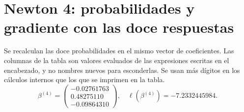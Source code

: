 \documentclass[11pt,a4paper]{article}
\begin{document}
\clearpage
\section{Newton 4: probabilidades y gradiente con las doce respuestas}\label{logit104}
Se recalculan las doce probabilidades en el mismo vector
de coeficientes. Las columnas de la tabla son valores evaluados
de las expresiones escritas en el encabezado, y no nombres nuevos
para esconderlas. Se usan más dígitos en los cálculos internos
que los que se imprimen en la tabla.
\[
\beta^{(4)}=\begin{pmatrix}-0.02761763\\0.48275110\\-0.09864310\end{pmatrix},\quad \ell(\beta^{(4)})=-7.2332445984.
\]
\end{document}
